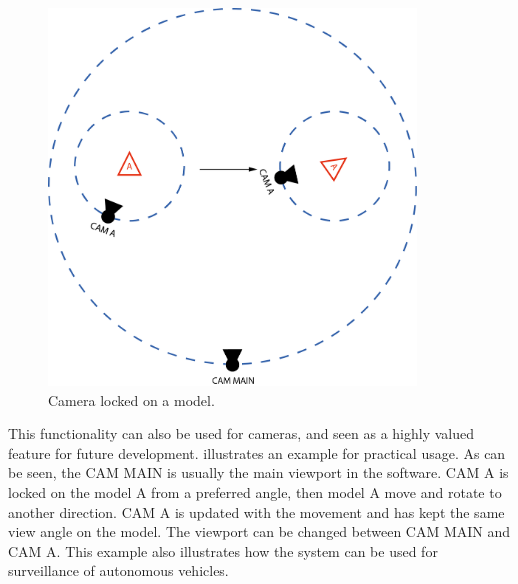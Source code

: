 \begin{figure}[ht]
    \centering
    \includegraphics[height=10cm]{images/cam_ex.png}
    \caption[Camera locked on a model]{Camera locked on a model.}
    \label{fig:cam_ex}
\end{figure}

This functionality can also be used for cameras, and seen as a highly valued feature for future development.  illustrates an example for practical usage. As can be seen, the CAM MAIN is usually the main viewport in the software. CAM A is locked on the model A from a preferred angle, then model A move and rotate to another direction. CAM A is updated with the movement and has kept the same view angle on the model. The viewport can be changed between CAM MAIN and CAM A. This example also illustrates how the system can be used for surveillance of autonomous vehicles.